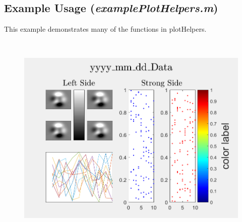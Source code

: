 \documentclass{article}
\begin{document}
	\subsection*{Example Usage (\textit{examplePlotHelpers.m})}
	This example demonstrates many of the functions in plotHelpers.
	
	
	\begin{figure}[H]
		\centering
		\includegraphics[height = 4in]{exampleplothelpers}
	\end{figure}
\end{document}
